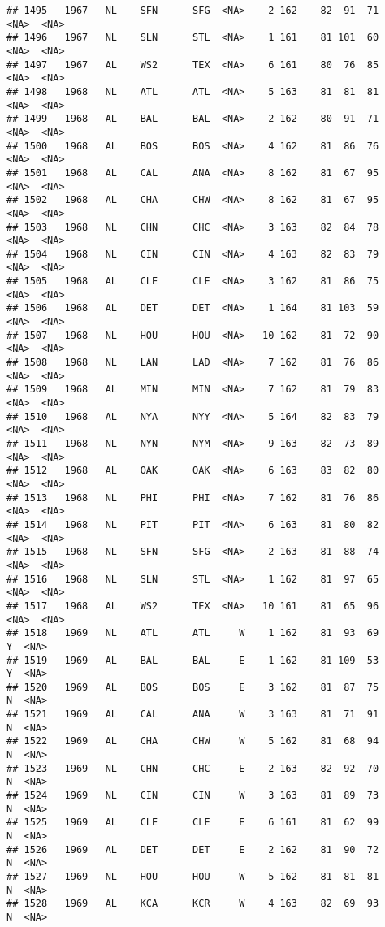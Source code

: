 \documentclass[]{article}
\begin{document}
\begin{verbatim}
## 1495   1967   NL    SFN      SFG  <NA>    2 162    82  91  71   <NA>  <NA>
## 1496   1967   NL    SLN      STL  <NA>    1 161    81 101  60   <NA>  <NA>
## 1497   1967   AL    WS2      TEX  <NA>    6 161    80  76  85   <NA>  <NA>
## 1498   1968   NL    ATL      ATL  <NA>    5 163    81  81  81   <NA>  <NA>
## 1499   1968   AL    BAL      BAL  <NA>    2 162    80  91  71   <NA>  <NA>
## 1500   1968   AL    BOS      BOS  <NA>    4 162    81  86  76   <NA>  <NA>
## 1501   1968   AL    CAL      ANA  <NA>    8 162    81  67  95   <NA>  <NA>
## 1502   1968   AL    CHA      CHW  <NA>    8 162    81  67  95   <NA>  <NA>
## 1503   1968   NL    CHN      CHC  <NA>    3 163    82  84  78   <NA>  <NA>
## 1504   1968   NL    CIN      CIN  <NA>    4 163    82  83  79   <NA>  <NA>
## 1505   1968   AL    CLE      CLE  <NA>    3 162    81  86  75   <NA>  <NA>
## 1506   1968   AL    DET      DET  <NA>    1 164    81 103  59   <NA>  <NA>
## 1507   1968   NL    HOU      HOU  <NA>   10 162    81  72  90   <NA>  <NA>
## 1508   1968   NL    LAN      LAD  <NA>    7 162    81  76  86   <NA>  <NA>
## 1509   1968   AL    MIN      MIN  <NA>    7 162    81  79  83   <NA>  <NA>
## 1510   1968   AL    NYA      NYY  <NA>    5 164    82  83  79   <NA>  <NA>
## 1511   1968   NL    NYN      NYM  <NA>    9 163    82  73  89   <NA>  <NA>
## 1512   1968   AL    OAK      OAK  <NA>    6 163    83  82  80   <NA>  <NA>
## 1513   1968   NL    PHI      PHI  <NA>    7 162    81  76  86   <NA>  <NA>
## 1514   1968   NL    PIT      PIT  <NA>    6 163    81  80  82   <NA>  <NA>
## 1515   1968   NL    SFN      SFG  <NA>    2 163    81  88  74   <NA>  <NA>
## 1516   1968   NL    SLN      STL  <NA>    1 162    81  97  65   <NA>  <NA>
## 1517   1968   AL    WS2      TEX  <NA>   10 161    81  65  96   <NA>  <NA>
## 1518   1969   NL    ATL      ATL     W    1 162    81  93  69      Y  <NA>
## 1519   1969   AL    BAL      BAL     E    1 162    81 109  53      Y  <NA>
## 1520   1969   AL    BOS      BOS     E    3 162    81  87  75      N  <NA>
## 1521   1969   AL    CAL      ANA     W    3 163    81  71  91      N  <NA>
## 1522   1969   AL    CHA      CHW     W    5 162    81  68  94      N  <NA>
## 1523   1969   NL    CHN      CHC     E    2 163    82  92  70      N  <NA>
## 1524   1969   NL    CIN      CIN     W    3 163    81  89  73      N  <NA>
## 1525   1969   AL    CLE      CLE     E    6 161    81  62  99      N  <NA>
## 1526   1969   AL    DET      DET     E    2 162    81  90  72      N  <NA>
## 1527   1969   NL    HOU      HOU     W    5 162    81  81  81      N  <NA>
## 1528   1969   AL    KCA      KCR     W    4 163    82  69  93      N  <NA>

\end{verbatim}
\end{document}
